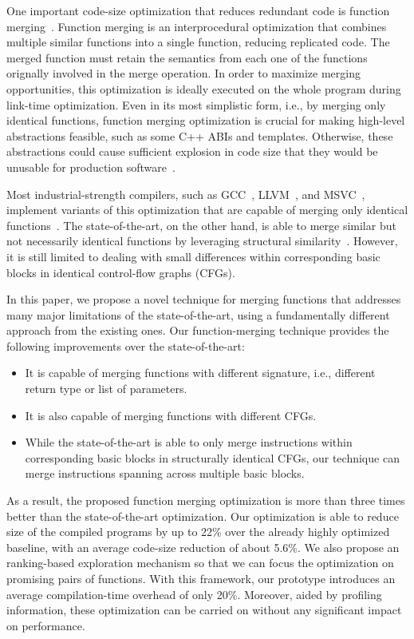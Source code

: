 One important code-size optimization that reduces redundant code is function
merging~\cite{tallam10,edler14}.
Function merging is an interprocedural optimization that combines multiple
similar functions into a single function, reducing replicated code.
The merged function must retain the semantics from each one of the functions
orignally involved in the merge operation.
In order to maximize merging opportunities, this optimization is ideally
executed on the whole program during link-time optimization.
Even in its most simplistic form, i.e., by merging only identical functions,
function merging optimization is crucial for making high-level abstractions
feasible, such as some C++ ABIs and templates.
Otherwise, these abstractions could cause sufficient explosion in code size that
they would be unusable for production software~\cite{tallam10,kwan12}.

Most industrial-strength compilers, such as GCC~\cite{gcc}, LLVM~\cite{llvm},
and MSVC~\cite{msvc-icf}, implement variants of this optimization that are
capable of merging only identical functions~\cite{tallam10,kwan12,livska14}.
The state-of-the-art, on the other hand, is able to merge similar but not
necessarily identical functions by leveraging structural similarity~\cite{edler14}.
However, it is still limited to dealing with small differences within
corresponding basic blocks in identical control-flow graphs (CFGs).

In this paper, we propose a novel technique for merging functions
that addresses many major limitations of the state-of-the-art, using a
fundamentally different approach from the existing ones.
Our function-merging technique provides the following improvements over
the state-of-the-art:
\begin{itemize}[noitemsep,topsep=0pt]
  \item It is capable of merging functions with different signature, i.e.,
  different return type or list of parameters.
  \item It is also capable of merging functions with different CFGs.
  \item While the state-of-the-art is able to only merge instructions within
  corresponding basic blocks in structurally identical CFGs,
  our technique can merge instructions spanning across multiple basic blocks.
\end{itemize}
As a result, the proposed function merging optimization is
more than three times better than the state-of-the-art optimization.
Our optimization is able to reduce size of the compiled programs by up to
22\% over the already highly optimized baseline, with an average code-size
reduction of about 5.6\%.
We also propose an ranking-based exploration mechanism so that we can focus
the optimization on promising pairs of functions.
With this framework, our prototype introduces an average compilation-time
overhead of only 20\%.
Moreover, aided by profiling information, these optimization can be carried on
without any significant impact on performance.



